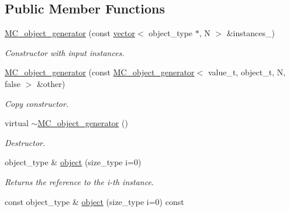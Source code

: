\subsection*{Public Member Functions}
\begin{DoxyCompactItemize}
\item 
\hypertarget{a00367_a772e666989503d5a955797affbfdf3da}{\hyperlink{a00367_a772e666989503d5a955797affbfdf3da}{M\-C\-\_\-object\-\_\-generator} (const \hyperlink{a00559}{vector}$<$ object\-\_\-type $\ast$, N $>$ \&instances\-\_\-)}\label{a00367_a772e666989503d5a955797affbfdf3da}

\begin{DoxyCompactList}\small\item\em Constructor with input instances. \end{DoxyCompactList}\item 
\hypertarget{a00367_a8c7f1390bbb9e13e8a1bbc220c54b188}{\hyperlink{a00367_a8c7f1390bbb9e13e8a1bbc220c54b188}{M\-C\-\_\-object\-\_\-generator} (const \hyperlink{a00364}{M\-C\-\_\-object\-\_\-generator}$<$ value\-\_\-t, object\-\_\-t, N, false $>$ \&other)}\label{a00367_a8c7f1390bbb9e13e8a1bbc220c54b188}

\begin{DoxyCompactList}\small\item\em Copy constructor. \end{DoxyCompactList}\item 
\hypertarget{a00367_a99dffb2e6ffd569524825739b30573f8}{virtual \hyperlink{a00367_a99dffb2e6ffd569524825739b30573f8}{$\sim$\-M\-C\-\_\-object\-\_\-generator} ()}\label{a00367_a99dffb2e6ffd569524825739b30573f8}

\begin{DoxyCompactList}\small\item\em Destructor. \end{DoxyCompactList}\item 
\hypertarget{a00367_ad72c3efd707a9223b70d02384d73fcfd}{object\-\_\-type \& \hyperlink{a00367_ad72c3efd707a9223b70d02384d73fcfd}{object} (size\-\_\-type i=0)}\label{a00367_ad72c3efd707a9223b70d02384d73fcfd}

\begin{DoxyCompactList}\small\item\em Returns the reference to the i-\/th instance. \end{DoxyCompactList}\item 
\hypertarget{a00367_a007fd575573311c637cbd69a4238111a}{const object\-\_\-type \& \hyperlink{a00367_a007fd575573311c637cbd69a4238111a}{object} (size\-\_\-type i=0) const }\label{a00367_a007fd575573311c637cbd69a4238111a}


\end{DoxyCompactItemize}

